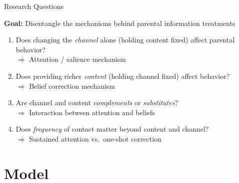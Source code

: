 \documentclass[aspectratio=169,11pt]{beamer}
\begin{document}
\begin{frame}{Research Questions}

\textbf{Goal:} Disentangle the mechanisms behind parental information treatments

\bigskip

\begin{enumerate}
    \item Does changing the \emph{channel} alone (holding content fixed) affect parental behavior?\\
    $\Rightarrow$ Attention / salience mechanism

    \bigskip

    \item Does providing richer \emph{content} (holding channel fixed) affect behavior?\\
    $\Rightarrow$ Belief correction mechanism

    \bigskip

    \item Are channel and content \emph{complements} or \emph{substitutes}?\\
    $\Rightarrow$ Interaction between attention and beliefs

    \bigskip

    \item Does \emph{frequency} of contact matter beyond content and channel?\\
    $\Rightarrow$ Sustained attention vs.\ one-shot correction
\end{enumerate}

\end{frame}

\section{Model}
\end{document}
